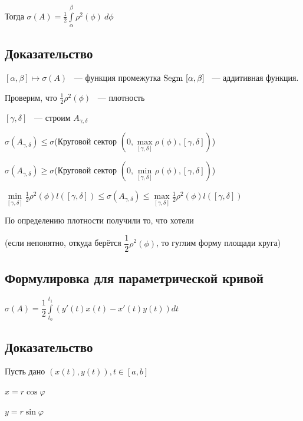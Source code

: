 \documentclass{article}
\begin{document}
            Тогда $\sigma(A) = \frac{1}{2} \int\limits^{\beta}_{\alpha} \rho^2(\phi) \ d \phi$
            
        \subsection{Доказательство}
        
            $[\alpha, \beta] \longmapsto \sigma(A)$ ~--- функция промежутка $\Segm [\alpha, \beta]$ ~--- аддитивная функция.
            
            Проверим, что $\frac{1}{2} \rho^2 (\phi)$ ~--- плотность
            
            $[\gamma, \delta]$ ~--- строим $A_{\gamma{,} \delta}$
            
            $\sigma (A_{\gamma{,} \delta}) \leq \sigma$(Круговой сектор $(0, \max\limits_{[\gamma, \delta]} \rho(\phi), [\gamma, \delta])$)
            
            $\sigma (A_{\gamma{,} \delta}) \geq \sigma$(Круговой сектор $(0, \min\limits_{[\gamma, \delta]} \rho(\phi), [\gamma, \delta])$)
            
            $\min\limits_{[\gamma, \delta]} \frac{1}{2} \rho^2(\phi) l([\gamma, \delta]) \leq \sigma (A_{\gamma{,} \delta}) \leq \max\limits_{[\gamma, \delta]} \frac{1}{2} \rho^2(\phi) l([\gamma, \delta])$
            
            По определению плотности получили то, что хотели
            
            (если непонятно, откуда берётся $\dfrac{1}{2} \rho^2(\phi)$, то гуглим форму площади круга)
            
        \subsection{Формулировка для параметрической кривой}
        
            $\sigma(A) = \dfrac{1}{2} \int\limits^{t_1}_{t_0} (y'(t) x(t) - x'(t) y(t)) dt$
            
        \subsection{Доказательство}
        
            Пусть дано $(x(t), y(t)), t \in [a, b]$
            
            $x = r \cos {\varphi}$
            
            $y = r \sin {\varphi}$
            
\end{document}

